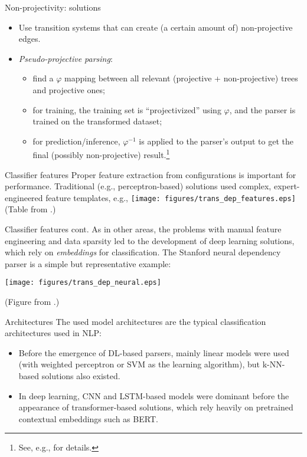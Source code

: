 \documentclass[style=upen, size=14pt]{powerdot}
\newcommand{\gold}{\color{arany}}
\theoremstyle{definition}
\begin{document}
\begin{slide}[toc=]{Non-projectivity: solutions}
  \begin{itemize}
  \item Use transition systems that can create (a certain amount of)
    non-projective edges.
  \item \emph{\gold Pseudo-projective parsing}:
    \begin{itemize}
    \item find a $\varphi$ mapping between all relevant (projective +
      non-projective) trees and projective ones;
    \item for training, the training set is ``projectivized'' using $\varphi$,
      and the parser is trained on the transformed dataset;
    \item for prediction/inference, $\varphi^{-1}$ is applied to the parser's
      output to get the final (possibly non-projective) result.\footnote{See,
        e.g., \cite{nivre-nilsson-2005-pseudo} for details.}
    \end{itemize}
  \end{itemize}
\end{slide}

\begin{slide}[toc=Features]{Classifier features}
  Proper feature extraction from configurations is important for performance.
  Traditional (e.g., perceptron-based) solutions used complex, expert-engineered
  feature templates, e.g.,
  \texttt{[image: figures/trans\_dep\_features.eps]}\\
  \footnotesize{\hspace{3.4cm}(Table from \cite{huang2009bilingually}.)}
\end{slide}

\begin{slide}[toc=]{Classifier features cont.}
  As in other areas, the problems with manual feature engineering and data
  sparsity led to the development of deep learning solutions, which rely on
  \emph{embeddings} for classification. The Stanford neural dependency parser is
  a simple but representative example:
  \begin{center}
    \texttt{[image: figures/trans\_dep\_neural.eps]}
    
    \footnotesize{(Figure from \cite{chen2014fast}.)}
  \end{center}
\end{slide}

\begin{slide}[toc=]{Architectures}
  The used model architectures are the typical classification architectures used
  in NLP:
  \begin{itemize}
  \item Before the emergence of DL-based parsers, mainly linear models were used
    (with weighted perceptron or SVM as the learning algorithm), but k-NN-based
    solutions also existed.
  \item In deep learning, CNN and LSTM-based models were dominant before the
    appearance of transformer-based solutions, which rely heavily on pretrained
    contextual embeddings such as BERT.
  \end{itemize}
\end{slide}
\end{document}
